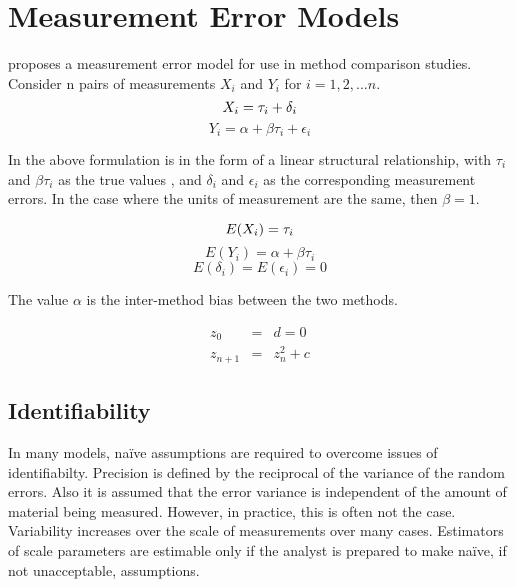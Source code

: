 \documentclass[Main.tex]{subfiles}
\begin{document}
\newpage
\section{Measurement Error Models}

\citet{DunnSEME} proposes a measurement error model for use in
method comparison studies. Consider n pairs of measurements
$X_{i}$ and $Y_{i}$ for $i=1,2,...n$.
\begin{equation}
X_{i} = \tau_{i}+\delta_{i}\\
\end{equation}
\begin{equation}
Y_{i} = \alpha +\beta\tau_{i}+\epsilon_{i} \nonumber
\end{equation}

In the above formulation is in the form of a linear structural
relationship, with $\tau_{i}$ and $\beta\tau_{i}$ as the true
values , and $\delta_{i}$ and $\epsilon_{i}$ as the corresponding
measurement errors. In the case where the units of measurement are
the same, then $\beta =1$.

\begin{equation}
E(X_{i}) = \tau_{i}\\
\end{equation}
\begin{equation}
E(Y_{i}) = \alpha +\beta\tau_{i} \nonumber
\end{equation}
\begin{equation}
E(\delta_{i}) = E(\epsilon_{i}) = 0 \nonumber
\end{equation}

The value $\alpha$ is the inter-method bias between the two
methods.


\begin{eqnarray}
z_0 &=& d = 0 \\
z_{n+1} &=& z_n^2+c
\end{eqnarray}




\subsection{Identifiability}
In many models,  naïve assumptions are required to overcome issues of identifiabilty.
Precision is defined by the reciprocal of the variance of the random errors. 
Also it is assumed that the error variance is independent of the amount of material being measured. However, in practice, this is often not the case. Variability increases over the scale of measurements over many cases.
Estimators of scale parameters are estimable only if the analyst is prepared to make naïve, if not unacceptable, assumptions.
\end{document}
